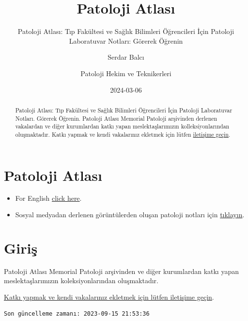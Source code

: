 \documentclass[
  letterpaper,
  DIV=11,
  numbers=noendperiod]{scrreprt}
\title{Patoloji Atlası}
\subtitle{Patoloji Atlası: Tıp Fakültesi ve Sağlık Bilimleri Öğrencileri
İçin Patoloji Laboratuvar Notları: Görerek Öğrenin}
\author{Serdar Balcı \and Patoloji Hekim ve Teknikerleri}
\date{2024-03-06}
\renewcommand*\contentsname{Içindekiler}
\newcommand\contentsname{Içindekiler}
\begin{document}
\maketitle
\begin{abstract}
Patoloji Atlası: Tıp Fakültesi ve Sağlık Bilimleri Öğrencileri İçin
Patoloji Laboratuvar Notları. Görerek Öğrenin. Patoloji Atlası Memorial
Patoloji arşivinden derlenen vakalardan ve diğer kurumlardan katkı yapan
meslektaşlarımızın kolleksiyonlarından oluşmaktadır. Katkı yapmak ve
kendi vakalarınız ekletmek için lütfen
\href{https://www.patolojiatlasi.com/katki.html}{iletişime geçin}.
\end{abstract}
\renewcommand*\contentsname{İçindekiler}
{
\hypersetup{linkcolor=}
\setcounter{tocdepth}{1}
\tableofcontents
}

\chapter*{Patoloji Atlası}\label{sec-patoloji-atlasi}


\begin{itemize}
\item
  For English \href{https://www.histopathologyatlas.com/}{click here}.
\item
  Sosyal medyadan derlenen görüntülerden oluşan patoloji notları için
  \href{https://www.patolojinotlari.com/}{tıklayın}.\\
\end{itemize}


\chapter*{Giriş}\label{sec-giris}


Patoloji Atlası Memorial Patoloji arşivinden ve diğer kurumlardan katkı
yapan meslektaşlarımızın koleksiyonlarından oluşmaktadır.

\href{https://www.patolojiatlasi.com/katki.html}{Katkı yapmak ve kendi
vakalarınız ekletmek için lütfen iletişime geçin}.

\begin{verbatim}
Son güncelleme zamanı: 2023-09-15 21:53:36
\end{verbatim}
\end{document}
